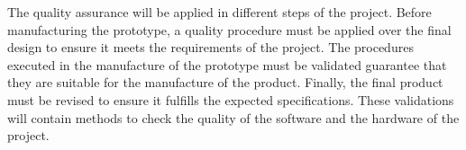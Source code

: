The quality assurance will be applied in different steps of the project. Before manufacturing the prototype, a quality procedure must be applied over the final design to ensure it meets the requirements of the project. The procedures executed in the manufacture of the prototype must be validated guarantee that they are suitable for the manufacture of the product. Finally, the final product must be revised to ensure it fulfills the expected specifications. These validations will contain methods to check the quality of the software and the hardware of the project.
